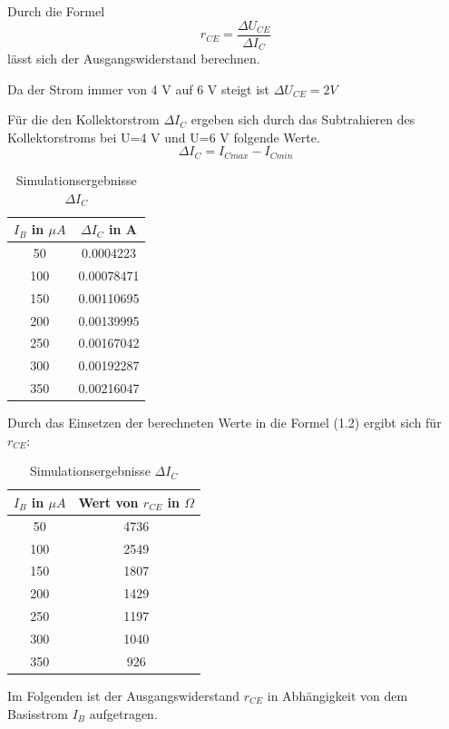         Durch die Formel 
        \begin{equation}
            r_{CE}=\frac{\Delta U_{CE}} {\Delta I_C}
        \end{equation}
        lässt sich der Ausgangswiderstand berechnen.

        Da der Strom immer von 4 V auf 6 V steigt ist \(\Delta U_{CE}= 2V\)

        Für die den Kollektorstrom \(\Delta I_C\) ergeben sich durch das Subtrahieren des Kollektorstroms bei U=4 V und U=6 V folgende Werte.
        \begin{equation}
            \Delta I_C=I_{Cmax}-I_{Cmin}
        \end{equation}

        \begin{table}[!ht]
        \centering
            \caption{Simulationsergebnisse \(\Delta I_C\)}
            \begin{tabular}{|c|c|}
                \hline
                \(I_B\) in \(\mu A\)& \(\Delta I_C\) in A\\ \hline \hline
                50 & 0.0004223 \\ \hline
                100 & 0.00078471\\ \hline
                150 & 0.00110695\\ \hline
                200 & 0.00139995\\ \hline
                250 & 0.00167042\\ \hline
                300 & 0.00192287\\ \hline
                350 & 0.00216047 \\ \hline
            \end{tabular}
        \end{table}

        Durch das Einsetzen der berechneten Werte in die Formel (1.2) ergibt sich für \(r_{CE}\):
        \begin{table}[!ht]
            \centering
            \caption{Simulationsergebnisse \(\Delta I_C\)}
            \begin{tabular}{|c|c|}
                \hline
                \(I_B\) in \(\mu A\)  & Wert von \(r_{CE}\) in \(\Omega\)\\
                \hline \hline
                50 & 4736 \\ \hline
                100 & 2549\\ \hline
                150 & 1807\\ \hline
                200 & 1429\\ \hline
                250 & 1197\\ \hline
                300 & 1040\\ \hline
                350 & 926\\ \hline
            \end{tabular}
        \end{table}
        \newpage
        Im Folgenden ist der Ausgangswiderstand \(r_{CE}\) in Abhängigkeit von dem Basisstrom \(I_B\) aufgetragen.

